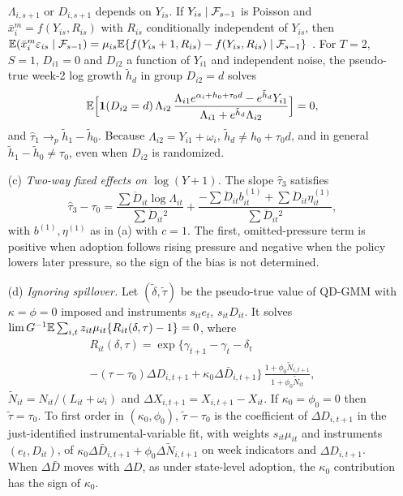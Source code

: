 \begin{theorem}
\begin{enumerate}
$\Lambda_{i,s+1}$ or $D_{i,s+1}$ depends on $Y_{is}$. If $Y_{is}\mid\F_{s-1}$ is Poisson and
$\bar x^m_i=f(Y_{is},R_{is})$ with $R_{is}$ conditionally independent of $Y_{is}$, then
$\E(\bar x^m_i\varepsilon_{is}\mid\F_{s-1})=\mu_{is}\E\{f(Y_{is}+1,R_{is})-f(Y_{is},R_{is})\mid\F_{s-1}\}$
\citep{chen1975poisson}. For $T=2$, $S=1$, $D_{i1}=0$ and $D_{i2}$ a function of $Y_{i1}$ and
independent noise, the pseudo-true week-2 log growth $\tilde h_d$ in group $D_{i2}=d$ solves
\begin{equation}
\E\Bigl[\ind(D_{i2}=d)\,\Lambda_{i2}\,\frac{\Lambda_{i1}e^{\alpha_i+h_0+\tau_0d}-e^{\tilde h_d}Y_{i1}}{\Lambda_{i1}+e^{\tilde h_d}\Lambda_{i2}}\Bigr]=0,
\label{eq:t2fe}
\end{equation}
and $\hat\tau_1\to_p\tilde h_1-\tilde h_0$. Because $\Lambda_{i2}=Y_{i1}+\omega_i$, $\tilde h_d\ne h_0+\tau_0d$, and in general
$\tilde h_1-\tilde h_0\ne\tau_0$, even when $D_{i2}$ is randomized.
\item[(c)] \emph{Two-way fixed effects on $\log(Y+1)$.} The slope $\hat\tau_3$ satisfies
\[
\hat\tau_3-\tau_0=\frac{\sum\ddot D_{it}\log\Lambda_{it}}{\sum\ddot D_{it}{}^2}+\frac{-\sum\ddot D_{it}b^{(1)}_{it}+\sum\ddot D_{it}\eta^{(1)}_{it}}{\sum\ddot D_{it}{}^2},
\]
with $b^{(1)},\eta^{(1)}$ as in (a) with $c=1$. The first, omitted-pressure term is positive when
adoption follows rising pressure and negative when the policy lowers later pressure, so the
sign of the bias is not determined.
\item[(d)] \emph{Ignoring spillover.} Let $(\tilde\delta,\tilde\tau)$ be the pseudo-true value of
QD-GMM with $\kappa=\phi=0$ imposed and instruments $s_{it}e_t$, $s_{it}D_{it}$. It solves
$\lim G^{-1}\mathbb{E}\sum_{i,t}z_{it}\mu_{it}\{R_{it}(\delta,\tau)-1\}=0$, where
\begin{multline*}
R_{it}(\delta,\tau)=\exp\{\gamma_{t+1}-\gamma_t-\delta_t\\
-(\tau-\tau_0)\Delta D_{i,t+1}+\kappa_0\Delta\bar D_{i,t+1}\}\,
\frac{1+\phi_0\tilde N_{i,t+1}}{1+\phi_0\tilde N_{it}},
\end{multline*}
$\tilde N_{it}=N_{it}/(L_{it}+\omega_i)$ and $\Delta X_{i,t+1}=X_{i,t+1}-X_{it}$. If $\kappa_0=\phi_0=0$ then $\tilde\tau=\tau_0$. To first
order in $(\kappa_0,\phi_0)$, $\tilde\tau-\tau_0$ is the coefficient of $\Delta D_{i,t+1}$ in the
just-identified instrumental-variable fit, with weights $s_{it}\mu_{it}$ and instruments
$(e_t,D_{it})$, of $\kappa_0\Delta\bar D_{i,t+1}+\phi_0\Delta\tilde N_{i,t+1}$ on week indicators
and $\Delta D_{i,t+1}$. When $\Delta\bar D$ moves with $\Delta D$, as under state-level adoption,
the $\kappa_0$ contribution has the sign of $\kappa_0$.
\end{enumerate}
\end{theorem}

